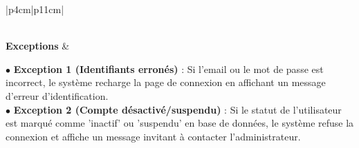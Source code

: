\documentclass[12pt,a4paper]{report}
\begin{document}
\begin{table}[H]
\begin{tabular}{|p{4cm}|p{11cm}|}
\begin{minipage}[t]{\linewidth}
\vspace{0.1cm}
\end{minipage} \\
\hline
\textbf{Exceptions} & 
\begin{minipage}[t]{\linewidth}
$\bullet$ \textbf{Exception 1 (Identifiants erronés)} : Si l'email ou le mot de passe est incorrect, le système recharge la page de connexion en affichant un message d'erreur d'identification.\\
$\bullet$ \textbf{Exception 2 (Compte désactivé/suspendu)} : Si le statut de l'utilisateur est marqué comme 'inactif' ou 'suspendu' en base de données, le système refuse la connexion et affiche un message invitant à contacter l'administrateur.
\vspace{0.1cm}
\end{minipage} \\
\hline
\end{tabular}
\end{table}
\end{document}

